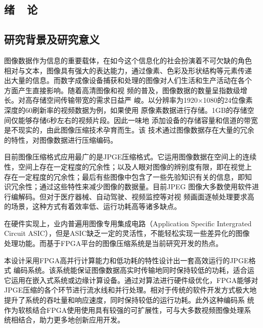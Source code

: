 \documentclass{article}
\numberwithin {equation}{section}
\begin{document}
\newpage
\tableofcontents

\newpage
\setcounter{page}{1}

\begin{spacing}{1.25} %
\section{绪\ \ 论}
  \subsection{研究背景及研究意义}
    \vspace{1em}
    图像数据作为信息的重要载体，在如今这个信息化的社会扮演着不可欠缺的角色
    相对与文本，图像具有强大的表达能力，通过像素、色彩及形状结构等元素传递
    出大量的信息。而数字成像设备捕获和处理的图像对人们生活和生产活动在各个
    方面产生直接影响。\cite{数字图像处理MATLAB版本科教学版}随着高清图像和视
    频的普及，图像数据的数量呈指数级增长。对高存储空间传输带宽的需求日益严
    峻。以分辨率为1920×1080的24位像素深度的60刷新率的视频数据为例，如果使用
    原像素数据进行存储。1GB的存储空间仅能够存储6秒左右的视频片段。因此一味地
    添加设备的存储容量和信道的带宽是不现实的，由此图像压缩技术孕育而生。该
    技术通过图像数据存在大量的冗余的特性，对图像数据进行压缩编码。

    目前图像压缩格式应用最广的是JPGE压缩格式。它运用图像数据在空间上的连续
    性，空间上存在一定程度的冗余性；以及人眼对图像的辨别度有限，即在视觉上
    存在一定程度的冗余性；最后有些图像中包含了一些先验知识有关的信息，即知
    识冗余性；通过这些特性\cite{1022468688.nh}来减少图像的数据量。目前JPEG
    图像大多数使用软件进行编解码。但对于医疗器械、自动驾驶、视频监控等对视
    频画面逐帧处理要求高的场景，这种方式有着效率低、运行功耗高等诸多缺点。

    在硬件实现上，业内普遍用图像专用集成电路（Application Specific Intergrated
    Circuit ASIC），但是ASIC缺乏一定的灵活性，不能轻松实现一些差异化的图像
    处理功能。而基于FPGA平台的图像压缩系统是当前研究开发的热点。
    
    本设计采用FPGA高并行计算能力和低功耗的特性设计出一套高效运行的JPGE格式
    编码系统。该系统能保证图像数据高实时传输地同时保持较低的功耗，适合运
    它运用在嵌入式系统或边缘计算设备。通过对算法进行硬件级优化，FPGA能够对
    JPGE压缩的各个环节进行流水线和并行处理。相对于传统的软件开发方式极大地
    提升了系统的吞吐量和响应速度，同时保持较低的运行功耗。此外这种编码系
    统作为软核结合FPGA使用使用具有较强的可扩展性，可与大多数视频图像处理系
    统相结合，助力更多地创新应用开发。

\end{spacing}
\end{document}
